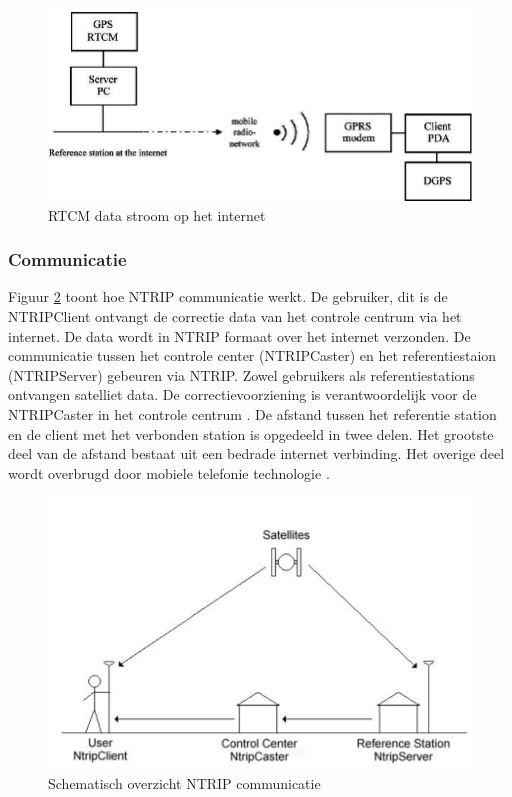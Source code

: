 \begin{figure}[hbp]
	\includegraphics[scale=0.4]{NTRIP2.png}
	\centering
	\caption{RTCM data stroom op het internet \cite{LBibNTRIP2}}
	\label{imgNTRIP2}
\end{figure} 

\subsubsection{Communicatie}
Figuur \ref{imgNTRIPCom} toont hoe NTRIP communicatie werkt. De gebruiker, dit is de NTRIPClient ontvangt de correctie data van het controle centrum via het internet. De data wordt in NTRIP formaat over het internet verzonden. De communicatie tussen het controle center (NTRIPCaster) en het referentiestaion (NTRIPServer) gebeuren via NTRIP. Zowel gebruikers als referentiestations ontvangen satelliet data. De correctievoorziening is verantwoordelijk voor de NTRIPCaster in het controle centrum \cite{LBibNTRIP4}. De afstand tussen het referentie station en de client met het verbonden station is opgedeeld in twee delen. Het grootste deel van de afstand bestaat uit een bedrade internet verbinding. Het overige deel wordt overbrugd door mobiele telefonie technologie \cite{LBibNTRIP2}.

\begin{figure}[h!]
	\includegraphics[scale=0.55]{NTRIPCommunication.png}
	\centering
	\caption{Schematisch overzicht NTRIP communicatie \cite{LBibNTRIP4}}
	\label{imgNTRIPCom}
\end{figure}

